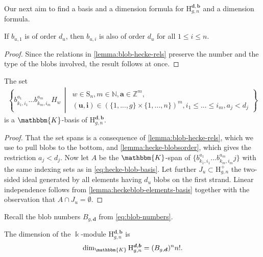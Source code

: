 \documentclass[a4paper,11pt]{amsart}
\renewcommand{\dots}{\text{...}}
\newcommand{\setstuff}[1]{\mathrm{#1}}
\newcommand{\Z}{\mathbb{Z}}
\newcommand{\KK}{\mathbbm{K}}
\newcommand{\N}{\mathbb{N}}
\newcommand{\bsym}[1]{\boldsymbol{#1}}
\newcommand{\bpar}{\bsym{b}}
\newcommand{\dpar}{\bsym{d}}
\numberwithin{equation}{section}
\let\fullref\autoref
\begin{document}
Our next aim to find a basis 
and a dimension formula 
for $\setstuff{H}_{g,n}^{\dpar,\bpar}$ and a dimension formula.

\begin{lemma}\label{lemma:hecke-blobsorder}
If $b_{u,1}$ is of 
order $d_{u}$, then $b_{u,i}$ is also of 
order $d_{u}$ for all $1\leq i\leq n$.
\end{lemma}

\begin{proof}
Since the relations in \fullref{lemma:blob-hecke-rels} 
preserve the number and the type of the blobs involved,
the result follows at once.
\end{proof}

\begin{proposition}\label{proposition:heckeblobcyclo-elements-basis}
The set 
\begin{gather}\label{eq:hecke-blob-basis}
\left\{ 
b_{k_{1},i_{1}}^{a_{1}}\dots 
b_{k_{m},i_{m}}^{a_{m}}H_{w} 
\,\middle\vert\,
\begin{gathered}
w\in\setstuff{S}_{n},
m\in\N,
\bsym{a}\in\Z^{m},
\\
(\bsym{u},\bsym{i})\in(\{1,\dots,g\}\times\{1,\dots,n\})^{m},
i_{1}\leq\dots\leq i_{m},a_{j}<d_{j}
\end{gathered}
\right\} 
\end{gather}
is a $\KK$-basis of $\setstuff{H}_{g,n}^{\dpar,\bpar}$.
\end{proposition}

\begin{proof}
That the set spans is a consequence 
of \fullref{lemma:blob-hecke-rels}, which we use to pull 
blobs to the bottom,
and \fullref{lemma:hecke-blobsorder}, which gives 
the restriction $a_{j}<d_{j}$.
Now let $A$ be the $\KK$-span of $\{b_{k_{1},i_{1}}^{a_{1}}\dots  b_{k_{m},i_{m}}^{a_{m}}j\}$ with the same indexing sets as in 
\eqref{eq:hecke-blob-basis}. Let further 
$J_{u}\subset\setstuff{H}_{g,n}^{+}$ 
the two-sided ideal 
generated by  all elements having $d_{u}$ blobs 
on the first strand. 
Linear independence follows from 
\fullref{lemma:heckeblob-elements-basis} 
together with the observation that $A\cap J_{u}=\emptyset$. 
\end{proof}

Recall the blob numbers $B_{g,\dpar}$ from \eqref{eq:blob-numbers}.

\begin{proposition}
The dimension of the $\Bbbk$-module $\setstuff{H}_{g,n}^{\dpar,\bpar}$ is
\begin{gather*}
\dim_{\KK}\setstuff{H}_{g,n}^{\dpar,\bpar}
=(B_{g,\dpar})^{n}n!. 
\end{gather*}
\end{proposition}
\end{document}
